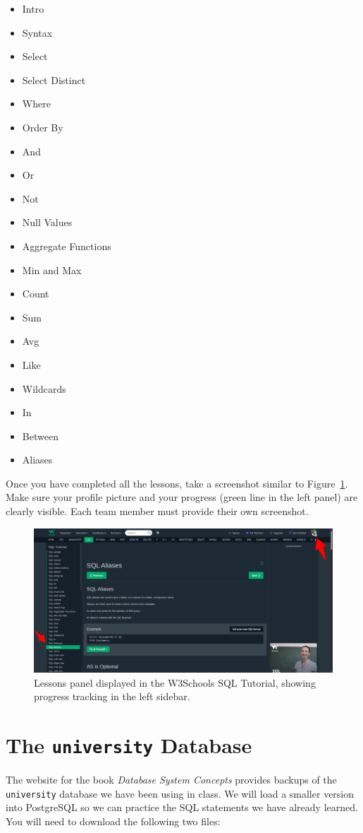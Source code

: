 \documentclass{article}
\begin{document}
\begin{itemize}
  \item Intro
  \item Syntax
  \item Select
  \item Select Distinct
  \item Where
  \item Order By
  \item And
  \item Or
  \item Not
  \item Null Values
  \item Aggregate Functions
  \item Min and Max
  \item Count
  \item Sum
  \item Avg
  \item Like
  \item Wildcards
  \item In
  \item Between
  \item Aliases
\end{itemize}

Once you have completed all the lessons, take a screenshot similar to Figure~\ref{fig:panel}. Make sure your profile picture and your progress (green line in the left panel) are clearly visible. Each team member must provide their own screenshot.

\begin{figure}[t]
 \centering
 \includegraphics[width=\textwidth]{figures/w3sql}
 \caption{Lessons panel displayed in the W3Schools SQL Tutorial, showing progress tracking in the left sidebar.}
 \label{fig:panel}
\end{figure}

\section{The \texttt{university} Database}
The website for the book \textit{Database System Concepts} provides backups of the \texttt{university} database we have been using in class. We will load a smaller version into PostgreSQL so we can practice the SQL statements we have already learned. You will need to download the following two files:
\end{document}

